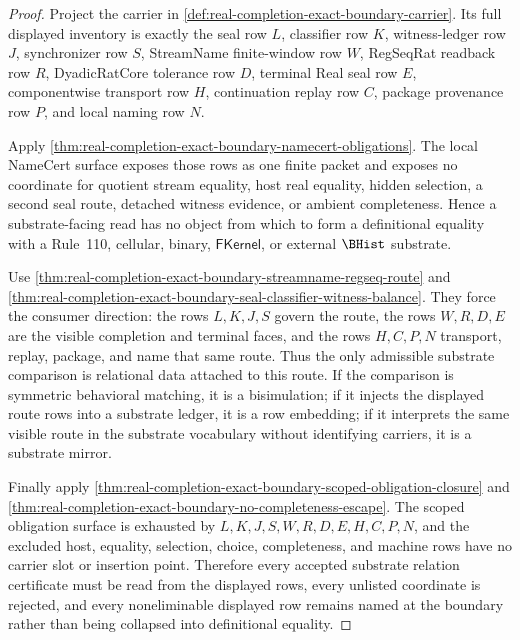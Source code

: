 \begin{proof}
Project the carrier in \autoref{def:real-completion-exact-boundary-carrier}. Its full displayed inventory is exactly the seal row $L$, classifier row $K$, witness-ledger row $J$, synchronizer row $S$, StreamName finite-window row $W$, RegSeqRat readback row $R$, DyadicRatCore tolerance row $D$, terminal Real seal row $E$, componentwise transport row $H$, continuation replay row $C$, package provenance row $P$, and local naming row $N$.

Apply \autoref{thm:real-completion-exact-boundary-namecert-obligations}. The local NameCert surface exposes those rows as one finite packet and exposes no coordinate for quotient stream equality, host real equality, hidden selection, a second seal route, detached witness evidence, or ambient completeness. Hence a substrate-facing read has no object from which to form a definitional equality with a Rule~110, cellular, binary, $\mathsf{FKernel}$, or external $\BHist$ substrate.

Use \autoref{thm:real-completion-exact-boundary-streamname-regseq-route} and \autoref{thm:real-completion-exact-boundary-seal-classifier-witness-balance}. They force the consumer direction: the rows $L,K,J,S$ govern the route, the rows $W,R,D,E$ are the visible completion and terminal faces, and the rows $H,C,P,N$ transport, replay, package, and name that same route. Thus the only admissible substrate comparison is relational data attached to this route. If the comparison is symmetric behavioral matching, it is a bisimulation; if it injects the displayed route rows into a substrate ledger, it is a row embedding; if it interprets the same visible route in the substrate vocabulary without identifying carriers, it is a substrate mirror.

Finally apply \autoref{thm:real-completion-exact-boundary-scoped-obligation-closure} and \autoref{thm:real-completion-exact-boundary-no-completeness-escape}. The scoped obligation surface is exhausted by $L,K,J,S,W,R,D,E,H,C,P,N$, and the excluded host, equality, selection, choice, completeness, and machine rows have no carrier slot or insertion point. Therefore every accepted substrate relation certificate must be read from the displayed rows, every unlisted coordinate is rejected, and every noneliminable displayed row remains named at the boundary rather than being collapsed into definitional equality.
\end{proof}

